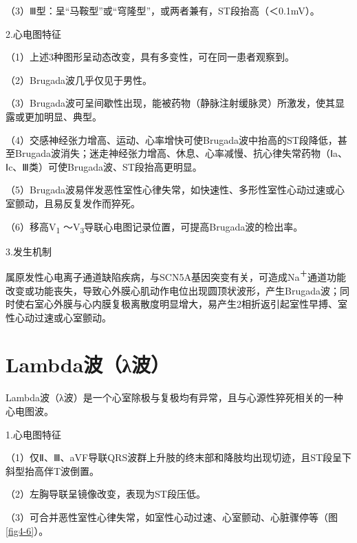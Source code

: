 （3）Ⅲ型：呈“马鞍型”或“穹隆型”，或两者兼有，ST段抬高（＜0.1mV）。

2.心电图特征

（1）上述3种图形呈动态改变，具有多变性，可在同一患者观察到。

（2）Brugada波几乎仅见于男性。

（3）Brugada波可呈间歇性出现，能被药物（静脉注射缓脉灵）所激发，使其显露或更加明显、典型。

（4）交感神经张力增高、运动、心率增快可使Brugada波中抬高的ST段降低，甚至Brugada波消失；迷走神经张力增高、休息、心率减慢、抗心律失常药物（Ⅰa、Ⅰc、Ⅲ类）可使Brugada波、ST段抬高更明显。

（5）Brugada波易伴发恶性室性心律失常，如快速性、多形性室性心动过速或心室颤动，且易反复发作而猝死。

（6）移高V\textsubscript{1} ～V\textsubscript{3}导联心电图记录位置，可提高Brugada波的检出率。

3.发生机制

属原发性心电离子通道缺陷疾病，与SCN5A基因突变有关，可造成Na\textsuperscript{＋}通道功能改变或功能丧失，导致心外膜心肌动作电位出现圆顶状波形，产生Brugada波；同时使右室心外膜与心内膜复极离散度明显增大，易产生2相折返引起室性早搏、室性心动过速或心室颤动。

\protect\hypertarget{text00010.htmlux5cux23subid72}{}{}

\section{Lambda波（λ波）}

Lambda波（λ波）是一个心室除极与复极均有异常，且与心源性猝死相关的一种心电图波。

1.心电图特征

（1）仅Ⅱ、Ⅲ、aVF导联QRS波群上升肢的终末部和降肢均出现切迹，且ST段呈下斜型抬高伴T波倒置。

（2）左胸导联呈镜像改变，表现为ST段压低。

（3）可合并恶性室性心律失常，如室性心动过速、心室颤动、心脏骤停等（图\ref{fig4-6}）。

